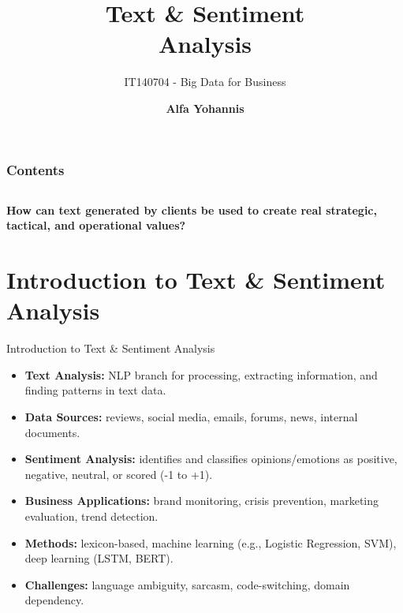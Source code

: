 \documentclass[aspectratio=169, table]{beamer}
\title{\Huge Text \& Sentiment \\
\vspace{10pt}
 Analysis}
\subtitle{IT140704 - Big Data for Business}
\author{\textbf{Alfa Yohannis}}
\begin{document}
\frame{\titlepage}


\begin{frame}[fragile]
\frametitle{Contents}
\vspace{20pt}
\begin{columns}[t]
	\tableofcontents[sections={1-5}]
	
	\tableofcontents[sections={6-20}]
\end{columns}
\end{frame}

\begin{frame}{\hfill}
	\centering
	\Huge{\textbf{How can text generated by clients be used to create real strategic, tactical, and operational values?}}
\end{frame}


\section{Introduction to Text \& Sentiment Analysis}

\begin{frame}{Introduction to Text \& Sentiment Analysis}
	\vspace{20pt}
	\begin{itemize}
		\item \textbf{Text Analysis:} NLP branch for processing, extracting information, and finding patterns in text data.
		\item \textbf{Data Sources:} reviews, social media, emails, forums, news, internal documents.
		\item \textbf{Sentiment Analysis:} identifies and classifies opinions/emotions as positive, negative, neutral, or scored (-1 to +1).
		\item \textbf{Business Applications:} brand monitoring, crisis prevention, marketing evaluation, trend detection.
		\item \textbf{Methods:} lexicon-based, machine learning (e.g., Logistic Regression, SVM), deep learning (LSTM, BERT).
		\item \textbf{Challenges:} language ambiguity, sarcasm, code-switching, domain dependency.
	\end{itemize}
\end{frame}
\end{document}
